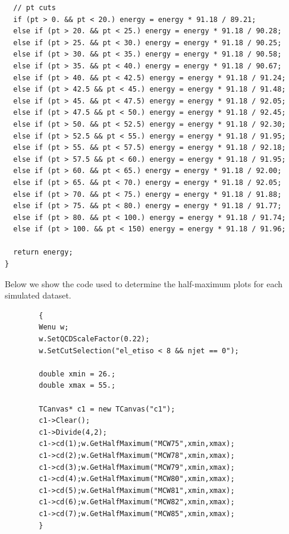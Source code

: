 \documentclass[a4paper]{report}
\numberwithin{equation}{section}
\begin{document}
\begin{tcolorbox}
\begin{verbatim}
  // pt cuts
  if (pt > 0. && pt < 20.) energy = energy * 91.18 / 89.21;
  else if (pt > 20. && pt < 25.) energy = energy * 91.18 / 90.28;
  else if (pt > 25. && pt < 30.) energy = energy * 91.18 / 90.25;
  else if (pt > 30. && pt < 35.) energy = energy * 91.18 / 90.58;
  else if (pt > 35. && pt < 40.) energy = energy * 91.18 / 90.67;
  else if (pt > 40. && pt < 42.5) energy = energy * 91.18 / 91.24;
  else if (pt > 42.5 && pt < 45.) energy = energy * 91.18 / 91.48;
  else if (pt > 45. && pt < 47.5) energy = energy * 91.18 / 92.05;
  else if (pt > 47.5 && pt < 50.) energy = energy * 91.18 / 92.45;
  else if (pt > 50. && pt < 52.5) energy = energy * 91.18 / 92.30;
  else if (pt > 52.5 && pt < 55.) energy = energy * 91.18 / 91.95;
  else if (pt > 55. && pt < 57.5) energy = energy * 91.18 / 92.18;
  else if (pt > 57.5 && pt < 60.) energy = energy * 91.18 / 91.95;
  else if (pt > 60. && pt < 65.) energy = energy * 91.18 / 92.00;
  else if (pt > 65. && pt < 70.) energy = energy * 91.18 / 92.05;
  else if (pt > 70. && pt < 75.) energy = energy * 91.18 / 91.88;
  else if (pt > 75. && pt < 80.) energy = energy * 91.18 / 91.77;
  else if (pt > 80. && pt < 100.) energy = energy * 91.18 / 91.74;
  else if (pt > 100. && pt < 150) energy = energy * 91.18 / 91.96;

  return energy;
} 
\end{verbatim}
\end{tcolorbox}

Below we show the code used to determine the half-maximum plots for each simulated dataset. 

\begin{tcolorbox}
    \begin{verbatim}
        {
        Wenu w;
        w.SetQCDScaleFactor(0.22);
        w.SetCutSelection("el_etiso < 8 && njet == 0");

        double xmin = 26.;
        double xmax = 55.;

        TCanvas* c1 = new TCanvas("c1");
        c1->Clear();
        c1->Divide(4,2);
        c1->cd(1);w.GetHalfMaximum("MCW75",xmin,xmax);
        c1->cd(2);w.GetHalfMaximum("MCW78",xmin,xmax);
        c1->cd(3);w.GetHalfMaximum("MCW79",xmin,xmax);
        c1->cd(4);w.GetHalfMaximum("MCW80",xmin,xmax);
        c1->cd(5);w.GetHalfMaximum("MCW81",xmin,xmax);
        c1->cd(6);w.GetHalfMaximum("MCW82",xmin,xmax);
        c1->cd(7);w.GetHalfMaximum("MCW85",xmin,xmax);
        }
    \end{verbatim}
\end{tcolorbox}
\end{document}
